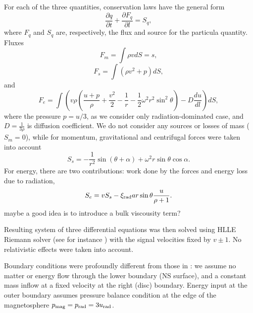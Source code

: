 \documentclass[usenatbib]{mnras}
\newcommand{\pardir}[2]{\ensuremath{\frac{\partial #2}{\partial #1} }}
\newcommand{\alert}[1]{\color{red}#1\color{black}}
\begin{document}
For each of the three quantities, conservation laws have the general form
\begin{equation}\label{E:timedep:qcons}
  \pardir{t}{q} + \pardir{l}{F_q} = S_q,
\end{equation}
where $F_q$ and $S_q$ are, respectively, the flux and source for the particula
quantity. Fluxes
\begin{equation}\label{E:timedep:fluxm}
F_m =  \int \rho v dS = s,
\end{equation}
\begin{equation}\label{E:timedep:fluxs}
F_s =  \int \left(\rho v^2 + p\right) dS,
\end{equation}
and
\begin{equation}\label{E:timedep:fluxe}
F_e =  \int \left( v \rho \left(\frac{u + p}{\rho} + \frac{v^2}{2} -\frac{1}{r} -
\frac{1}{2} \omega^2 r^2\sin^2\theta \right) - D \frac{du}{dl}\right) dS,
\end{equation}
where the pressure $p=u/3$, as we consider only radiation-dominated case, and
$D = \frac{1}{3\rho}$ is diffusion coefficient. We do not consider any sources
or losses of mass ($S_m=0$), while for momentum, gravitational and centrifugal forces
were taken into account
\begin{equation}\label{E:timedep:srcs}
S_s = - \frac{1}{r^2}\sin(\theta+\alpha) + \omega^2r \sin\theta \cos\alpha.
\end{equation}
For energy, there are two contributions: work done by the forces and energy
loss due to radiation,
\begin{equation}\label{E:timedep:srce}
  S_e = v S_s - \xi_{\rm rad} a r \sin\theta \frac{u}{\rho+1}.
\end{equation}
\alert{maybe a good idea is to introduce a bulk viscousity term?\\}

Resulting system of three differential equations was then solved using HLLE
Riemann solver (see for instance \citealt{einfeldt}) with the signal
velocities fixed by $v\pm 1$. No relativistic effects were taken into
account. 

Boundary conditions were profoundly different from those in \citet{basko-sunyaev1976}: we
assume no matter or energy flow through the lower boundary (NS surface), and a constant
mass inflow at a fixed velocity at the right (disc) boundary. Energy input at
the outer boundary assumes pressure balance condition at the edge of the
magnetosphere $p_{\rm mag} = p_{\rm rad} = 3u_{\rm rad}$.




\label{lastpage}
\end{document}
